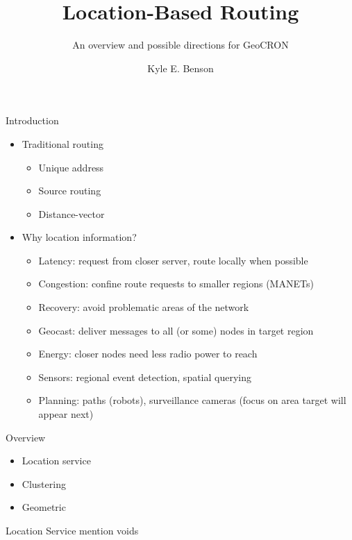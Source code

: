 \documentclass{beamer}
\begin{document}
\title[Location routing]{Location-Based Routing}
\subtitle{An overview and possible directions for GeoCRON}
\author[K. Benson]{Kyle E. Benson}


\begin{frame}
	\titlepage
\end{frame}


\begin{frame}{Introduction}

\begin{itemize}
	\item Traditional routing
	\begin{itemize}
		\item Unique address
		\item Source routing
		\item Distance-vector
	\end{itemize}
	
	\item Why location information?
	\begin{itemize}
		\item Latency: request from closer server, route locally when possible
		\item Congestion: confine route requests to smaller regions (MANETs)
		\item Recovery: avoid problematic areas of the network
		\item Geocast: deliver messages to all (or some) nodes in target region
		\item Energy: closer nodes need less radio power to reach
		\item Sensors: regional event detection, spatial querying
		\item Planning: paths (robots), surveillance cameras (focus on area target will appear next)
	\end{itemize}
\end{itemize}

\end{frame}


\begin{frame}{Overview}
	\begin{itemize}
		\item Location service
		\item Clustering
		\item Geometric
	\end{itemize}
\end{frame}


\begin{frame}{Location Service}
mention voids
\end{frame}
\end{document}
